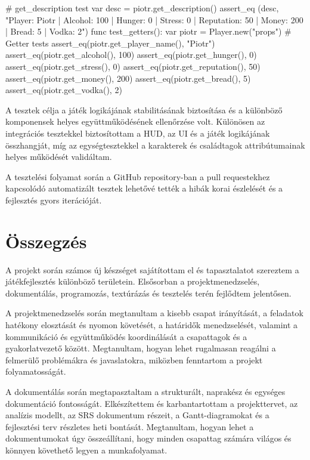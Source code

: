 \documentclass[12pt,a4paper]{article}
\begin{document}
\begin{itemize}
\begin{python}
    	# get_description test
    	var desc = piotr.get_description()
    	assert_eq
        (desc, "Player: Piotr | Alcohol: 100 | Hunger: 0 |
        Stress: 0 | Reputation: 50 | Money: 200 | Bread: 5 | 
        Vodka: 2")
    func test_getters():
    	var piotr = Player.new("props")
    	# Getter tests
    	assert_eq(piotr.get_player_name(), "Piotr")
    	assert_eq(piotr.get_alcohol(), 100)
    	assert_eq(piotr.get_hunger(), 0)
    	assert_eq(piotr.get_stress(), 0)
    	assert_eq(piotr.get_reputation(), 50)
    	assert_eq(piotr.get_money(), 200)
    	assert_eq(piotr.get_bread(), 5)
    	assert_eq(piotr.get_vodka(), 2)
    \end{python}
\end{itemize}

A tesztek célja a játék logikájának stabilitásának biztosítása és a különböző komponensek helyes együttműködésének ellenőrzése volt. Különösen az integrációs tesztekkel biztosítottam a HUD, az UI és a játék logikájának összhangját, míg az egységtesztekkel a karakterek és családtagok attribútumainak helyes működését validáltam. \cite{godot_gut}

A tesztelési folyamat során a GitHub repository-ban a pull requestekhez kapcsolódó automatizált tesztek lehetővé tették a hibák korai észlelését és a fejlesztés gyors iterációját.


\section{Összegzés}

A projekt során számos új készséget sajátítottam el és tapasztalatot szereztem a játékfejlesztés különböző területein. Elsősorban a projektmenedzselés, dokumentálás, programozás, textúrázás és tesztelés terén fejlődtem jelentősen. 

A projektmenedzselés során megtanultam a kisebb csapat irányítását, a feladatok hatékony elosztását és nyomon követését, a határidők menedzselését, valamint a kommunikáció és együttműködés koordinálását a csapattagok és a gyakorlatvezető között. Megtanultam, hogyan lehet rugalmasan reagálni a felmerülő problémákra és javaslatokra, miközben fenntartom a projekt folyamatosságát.

A dokumentálás során megtapasztaltam a strukturált, naprakész és egységes dokumentáció fontosságát. Elkészítettem és karbantartottam a projekttervet, az analízis modellt, az SRS dokumentum részeit, a Gantt-diagramokat és a fejlesztési terv részletes heti bontását. Megtanultam, hogyan lehet a dokumentumokat úgy összeállítani, hogy minden csapattag számára világos és könnyen követhető legyen a munkafolyamat.
\end{document}
